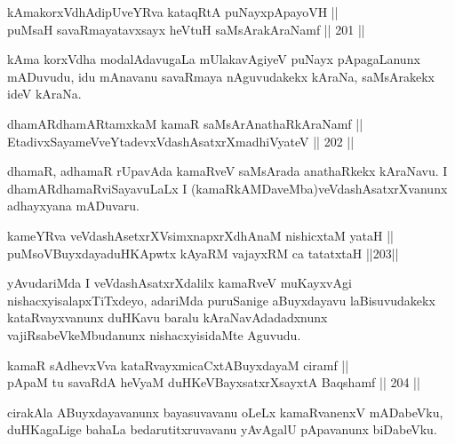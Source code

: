 
\begin{shl}
kAmakorxVdhAdipUveYRva kataqRtA puNayxpApayoVH || \\
puMsaH savaRmayatavxsayx heVtuH saMsArakAraNamf \hfill || 201 ||  
\end{shl}

\begin{artha}
kAma korxVdha modalAdavugaLa mUlakavAgiyeV puNayx pApagaLanunx
mADuvudu, idu mAnavanu savaRmaya nAguvudakekx kAraNa, saMsArakekx ideV
kAraNa.
\end{artha}


\begin{shl}
dhamARdhamARtamxkaM kamaR saMsArAnathaRkAraNamf || \\
EtadivxSayameVveYtadevxVdashAsatxrXmadhiVyateV \hfill || 202 ||  
\end{shl}

\begin{artha}
dhamaR, adhamaR rUpavAda kamaRveV saMsArada anathaRkekx kAraNavu. I
dhamARdhamaRviSayavuLaLx I (kamaRkAMDaveMba)\break veVdashAsatxrXvanunx
adhayxyana mADuvaru.
\end{artha}


\begin{shl}
kameYRva veVdashAsetxrXV\s simxnapxrXdhAnaM nishicxtaM yataH || \\
puMsoV\s BuyxdayaduHKApwtx kAyaRM vajayxRM ca tatatxtaH \hfill ||203||  
\end{shl}

\begin{artha}
yAvudariMda I veVdashAsatxrXdalilx kamaRveV muKayxvAgi
nishacxyisalapxTiTxdeyo, adariMda puruSanige aBuyxdayavu laBisuvudakekx
kataRvayxvanunx duHKavu baralu kAraNavAdadadxnunx
vajiRsabeVkeMbudanunx nishacxyisidaMte Aguvudu.
\end{artha}

\begin{shl}
kamaR sAdhevxVva kataRvayxmicaCxtA\s BuyxdayaM ciramf || \\
pApaM tu savaRdA heVyaM duHKeVBayxsatxrXsayxtA Baqshamf \hfill || 204 ||  
\end{shl}

\begin{artha}
cirakAla ABuyxdayavanunx bayasuvavanu oLeLx kamaRvanenxV mADabeVku,
duHKagaLige bahaLa bedarutitxruvavanu yAvAgalU pApavanunx biDabeVku.
\end{artha}

